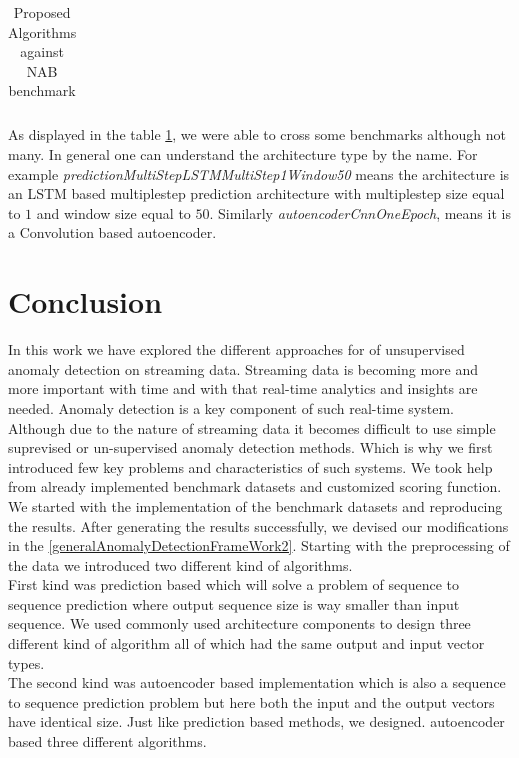 \documentclass[12pt]{article}
\begin{document}
\begin{table}[H]
\begin{tabular}{llll}
\end{tabular}
\caption{Proposed Algorithms against NAB benchmark}
\label{mainResultsTable}
\end{table}

As displayed in the table \ref{mainResultsTable}, we were able to cross some benchmarks although not many. In general one can understand the architecture type by the name. For example \textit{predictionMultiStepLSTMMultiStep1Window50} means the architecture is an LSTM based multiplestep prediction architecture with multiplestep size equal to $1$ and window size equal to $50$. Similarly \textit{autoencoderCnnOneEpoch}, means it is a Convolution based autoencoder.

\newpage
\section{Conclusion}
In this work we have explored the different approaches for of unsupervised anomaly detection on streaming data. Streaming data is becoming more and more important with time and with that real-time analytics and insights are needed. Anomaly detection is a key component of such real-time system. Although due to the nature of streaming data it becomes difficult to use simple suprevised or un-supervised anomaly detection methods. Which is why we first introduced few key problems and characteristics of such systems. We took help from already implemented benchmark datasets and customized scoring function.\\
\break
We started with the implementation of the benchmark datasets and reproducing the results. After generating the results successfully, we devised our modifications in the \ref{generalAnomalyDetectionFrameWork2}. Starting with the preprocessing of the data we introduced two different kind of algorithms.\\
\break
First kind was prediction based which will solve a problem of sequence to sequence prediction where output sequence size is way smaller than input sequence. We used commonly used architecture components to design three different kind of algorithm all of which had the same output and input vector types.\\
\break
The second kind was autoencoder based implementation which is also a sequence to sequence prediction problem but here both the input and the output vectors have identical size. Just like prediction based methods, we designed. autoencoder based three different algorithms.\\
\break
\end{document}
